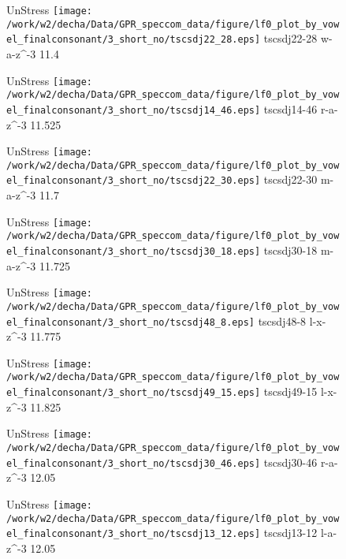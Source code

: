 \documentclass{article}
\begin{document}
\begin{figure}[t]
\begin{minipage}[b]{.24\textwidth}
UnStress
\centering
\texttt{[image: /work/w2/decha/Data/GPR\_speccom\_data/figure/lf0\_plot\_by\_vowel\_finalconsonant/3\_short\_no/tscsdj22\_28.eps]}
tscsdj22-28 w-a-z\textasciicircum-3 11.4
\end{minipage}
\begin{minipage}[b]{.24\textwidth}
UnStress
\centering
\texttt{[image: /work/w2/decha/Data/GPR\_speccom\_data/figure/lf0\_plot\_by\_vowel\_finalconsonant/3\_short\_no/tscsdj14\_46.eps]}
tscsdj14-46 r-a-z\textasciicircum-3 11.525
\end{minipage}
\begin{minipage}[b]{.24\textwidth}
UnStress
\centering
\texttt{[image: /work/w2/decha/Data/GPR\_speccom\_data/figure/lf0\_plot\_by\_vowel\_finalconsonant/3\_short\_no/tscsdj22\_30.eps]}
tscsdj22-30 m-a-z\textasciicircum-3 11.7
\end{minipage}
\begin{minipage}[b]{.24\textwidth}
UnStress
\centering
\texttt{[image: /work/w2/decha/Data/GPR\_speccom\_data/figure/lf0\_plot\_by\_vowel\_finalconsonant/3\_short\_no/tscsdj30\_18.eps]}
tscsdj30-18 m-a-z\textasciicircum-3 11.725
\end{minipage}
\end{figure}

\begin{figure}[t]
\begin{minipage}[b]{.24\textwidth}
UnStress
\centering
\texttt{[image: /work/w2/decha/Data/GPR\_speccom\_data/figure/lf0\_plot\_by\_vowel\_finalconsonant/3\_short\_no/tscsdj48\_8.eps]}
tscsdj48-8 l-x-z\textasciicircum-3 11.775
\end{minipage}
\begin{minipage}[b]{.24\textwidth}
UnStress
\centering
\texttt{[image: /work/w2/decha/Data/GPR\_speccom\_data/figure/lf0\_plot\_by\_vowel\_finalconsonant/3\_short\_no/tscsdj49\_15.eps]}
tscsdj49-15 l-x-z\textasciicircum-3 11.825
\end{minipage}
\begin{minipage}[b]{.24\textwidth}
UnStress
\centering
\texttt{[image: /work/w2/decha/Data/GPR\_speccom\_data/figure/lf0\_plot\_by\_vowel\_finalconsonant/3\_short\_no/tscsdj30\_46.eps]}
tscsdj30-46 r-a-z\textasciicircum-3 12.05
\end{minipage}
\begin{minipage}[b]{.24\textwidth}
UnStress
\centering
\texttt{[image: /work/w2/decha/Data/GPR\_speccom\_data/figure/lf0\_plot\_by\_vowel\_finalconsonant/3\_short\_no/tscsdj13\_12.eps]}
tscsdj13-12 l-a-z\textasciicircum-3 12.05
\end{minipage}
\end{figure}
\end{document}
